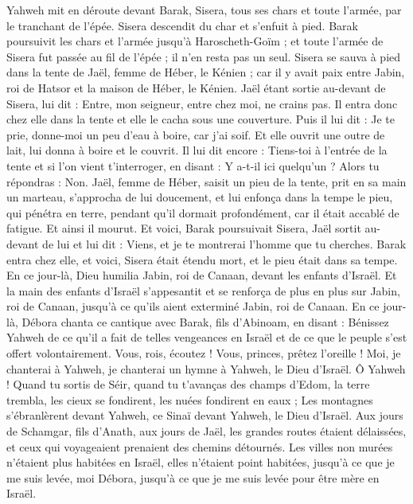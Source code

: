 \begin{multicols}{2}
Yahweh mit en déroute devant Barak, Sisera, tous ses chars et toute l'armée, par le tranchant de l'épée. Sisera descendit du char et s'enfuit à pied.
Barak poursuivit les chars et l'armée jusqu'à Haroscheth-Goïm ; et toute l'armée de Sisera fut passée au fil de l'épée ; il n'en resta pas un seul.
Sisera se sauva à pied dans la tente de Jaël, femme de Héber, le Kénien ; car il y avait paix entre Jabin, roi de Hatsor et la maison de Héber, le Kénien.
Jaël étant sortie au-devant de Sisera, lui dit : Entre, mon seigneur, entre chez moi, ne crains pas. Il entra donc chez elle dans la tente et elle le cacha sous une couverture.
Puis il lui dit : Je te prie, donne-moi un peu d'eau à boire, car j'ai soif. Et elle ouvrit une outre de lait, lui donna à boire et le couvrit.
Il lui dit encore : Tiens-toi à l'entrée de la tente et si l'on vient t'interroger, en disant : Y a-t-il ici quelqu'un ? Alors tu répondras : Non.
Jaël, femme de Héber, saisit un pieu de la tente, prit en sa main un marteau, s'approcha de lui doucement, et lui enfonça dans la tempe le pieu, qui pénétra en terre, pendant qu'il dormait profondément, car il était accablé de fatigue. Et ainsi il mourut.
Et voici, Barak poursuivait Sisera, Jaël sortit au-devant de lui et lui dit : Viens, et je te montrerai l'homme que tu cherches. Barak entra chez elle, et voici, Sisera était étendu mort, et le pieu était dans sa tempe.
En ce jour-là, Dieu humilia Jabin, roi de Canaan, devant les enfants d'Israël.
Et la main des enfants d'Israël s'appesantit et se renforça de plus en plus sur Jabin, roi de Canaan, jusqu'à ce qu'ils aient exterminé Jabin, roi de Canaan.
\VerseOne{}En ce jour-là, Débora chanta ce cantique avec Barak, fils d'Abinoam, en disant :
Bénissez Yahweh de ce qu'il a fait de telles vengeances en Israël et de ce que le peuple s'est offert volontairement.
Vous, rois, écoutez ! Vous, princes, prêtez l'oreille ! Moi, je chanterai à Yahweh, je chanterai un hymne à Yahweh, le Dieu d'Israël.
Ô Yahweh ! Quand tu sortis de Séir, quand tu t'avanças des champs d'Edom, la terre trembla, les cieux se fondirent, les nuées fondirent en eaux ;
Les montagnes s'ébranlèrent devant Yahweh, ce Sinaï devant Yahweh, le Dieu d'Israël.
Aux jours de Schamgar, fils d'Anath, aux jours de Jaël, les grandes routes étaient délaissées, et ceux qui voyageaient prenaient des chemins détournés.
Les villes non murées n'étaient plus habitées en Israël, elles n'étaient point habitées, jusqu'à ce que je me suis levée, moi Débora, jusqu'à ce que je me suis levée pour être mère en Israël.

\end{multicols}
